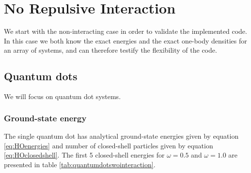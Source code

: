 \section{No Repulsive Interaction}
We start with the non-interacting case in order to validate the implemented code. In this case we both know the exact energies and the exact one-body densities for an array of systems, and can therefore testify the flexibility of the code.

\subsection{Quantum dots}
We will focus on quantum dot systems.

\subsubsection{Ground-state energy}
The single quantum dot has analytical ground-state energies given by equation \eqref{eq:HOenergies} and number of closed-shell particles given by equation \eqref{eq:HOclosedshell}. The first 5 closed-shell energies for $\omega=0.5$ and $\omega=1.0$ are presented in table \eqref{tab:quantumdotswointeraction}.

